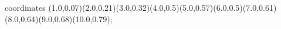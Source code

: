 					coordinates { (1.0,0.07)(2.0,0.21)(3.0,0.32)(4.0,0.5)(5.0,0.57)(6.0,0.5)(7.0,0.61)(8.0,0.64)(9.0,0.68)(10.0,0.79)};